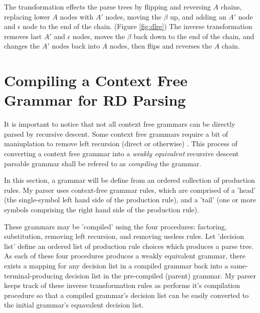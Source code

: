\documentclass[11pt]{article}
\begin{document}
The transformation effects the parse trees by flipping and reversing $A$ chains,
replacing lower $A$ nodes with $A'$ nodes, moving the $\beta$ up,
and adding an $A'$ node and $\epsilon$ node to the end of the chain. (Figure \ref{fig:dlre}) The inverse transformation
removes last $A'$ and $\epsilon$ nodes, moves the $\beta$ back down to the end of the chain, and changes the $A'$ nodes back into
$A$ nodes, then flips and reverses the $A$ chain.

\clearpage

\section{Compiling a Context Free Grammar for RD Parsing}

It is important to notice that not all context free grammars can be directly parsed by
recursive descent. Some context free grammars require a bit of maniuplation to remove
left recursion (direct or otherwise) \cite{compiler}. This process of converting a context
free grammar into a {\em weakly equivalent} recursive descent parsable grammar shall be refered to as
{\em compiling} the grammar.

In this section, a grammar will be define from an ordered collection of production rules.
My parser uses context-free grammar rules, which are comprised of a
'head' (the single-symbol left hand side of the production rule), and a 'tail'
(one or more symbols comprising the right hand side of the production rule).

These grammars may be 'compiled' using the four procedures:
factoring, substitution, removing left recursion, and removing useless
rules. Let 'decision list' define an ordered list of production rule
choices which produces a parse tree.
As each of these four procedures produces a weakly equivalent grammar,
there exists a mapping for any decision list in a compiled grammar
back into a same-terminal-producing decision list in the pre-compiled (parent) grammar.
My parser keeps track of these inverse transformation rules as performs
it's compilation procedure so that a compiled grammar's decision list can be easily
converted to the initial grammar's equavalent decision list. 
\end{document}
